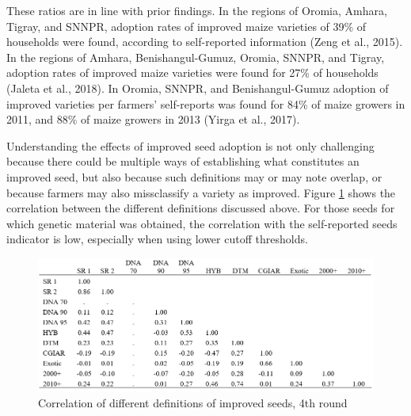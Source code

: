 \documentclass{article}
\begin{document}
These ratios are in line with prior findings. In the regions of Oromia, Amhara, Tigray, and SNNPR, adoption rates of improved maize varieties of 39\% of households were found, according to self-reported information (Zeng et al., 2015). In the regions of Amhara, Benishangul-Gumuz, Oromia, SNNPR, and Tigray, adoption rates of improved maize varieties were found for 27\% of households (Jaleta et al., 2018). In Oromia, SNNPR, and Benishangul-Gumuz adoption of improved varieties per farmers’ self-reports was found for 84\% of maize growers in 2011, and 88\% of maize growers in 2013 (Yirga et al., 2017).

Understanding the effects of improved seed adoption is not only challenging because there could be multiple ways of establishing what constitutes an improved seed, but also because such definitions may or may note overlap, or because farmers may also missclassify a variety as improved. Figure \ref{fig:missclassification} shows the correlation between the different definitions discussed above. For those seeds for which genetic material was obtained, the correlation with the self-reported seeds indicator is low, especially when using lower cutoff thresholds. 

\begin{figure}
    \centering
    \includegraphics{results/figures/missclassification.png}
    \caption{Correlation of different definitions of improved seeds, 4th round}
    \label{fig:missclassification}
\end{figure}
\end{document}
